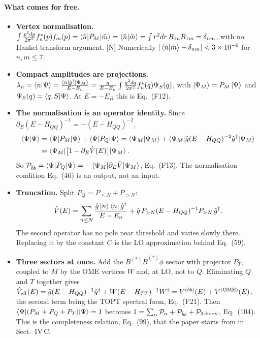 \documentclass[11pt,a4paper]{article}
\newcommand{\tagN}{\textcolor{red!70!black}{\textsf{\small[N]}}}
\renewcommand{\VQQ}{V^{(\bar bb)}}
\renewcommand{\VOME}{V^{\rm (OME)}}
\newcommand{\Pbb}{{\cal P}_{\bar bb}}
\begin{document}
\paragraph{What comes for free.}
\begin{itemize}
\item \textbf{Vertex normalisation.} $\int\frac{p^2dp}{2\pi^2}f_n^*(p)f_m(p)=\braket{\tilde n|P_M|\tilde m}=\braket{\tilde n|\tilde m}=\int r^2dr\,R_{1n}R_{1m}=\delta_{nm}$, with no Hankel-transform argument. \tagN{} Numerically $|\braket{\tilde n|\tilde m}-\delta_{nm}|<3\times10^{-6}$ for $n,m\le7$.
\item \textbf{Compact amplitudes are projections.} $\lambda_n=\braket{n|\Psi}=\frac{\braket{n|\hat g^\dagger|\Psi_M}}{E-E_n}=\frac{g}{E-E_n}\int\frac{q^2dq}{2\pi^2}f_n^*(q)\Psi_S(q)$, with $\ket{\Psi_M}=P_M\ket\Psi$ and $\Psi_S(q)=\braket{q,S|\Psi}$. At $E=-E_B$ this is Eq.~(F12).
\item \textbf{The normalisation is an operator identity.} Since $\partial_E(E-H_{QQ})^{-1}=-(E-H_{QQ})^{-2}$,
\begin{align}
\braket{\Psi|\Psi}&=\braket{\Psi|P_M|\Psi}+\braket{\Psi|P_Q|\Psi}
=\braket{\Psi_M|\Psi_M}+\braket{\Psi_M|\hat g(E-H_{QQ})^{-2}\hat g^\dagger|\Psi_M}\nonumber\\
&=\braket{\Psi_M|\big[1-\partial_E\hat V(E)\big]|\Psi_M}.
\end{align}
So $\Pbb=\braket{\Psi|P_Q|\Psi}=-\braket{\Psi_M|\partial_E\hat V|\Psi_M}$, Eq.~(F13). The normalisation condition Eq.~(46) is an output, not an input.
\item \textbf{Truncation.} Split $P_Q=P_{\le N}+P_{>N}$:
\begin{equation}
\hat V(E)=\sum_{n\le N}\frac{\hat g\ket n\bra n\hat g^\dagger}{E-E_n}+\hat g\,P_{>N}(E-H_{QQ})^{-1}P_{>N}\,\hat g^\dagger .
\end{equation}
The second operator has no pole near threshold and varies slowly there. Replacing it by the constant $C$ is the LO approximation behind Eq.~(59).
\item \textbf{Three sectors at once.} Add the $B^{(*)}\bar B^{(*)}\phi$ sector with projector $P_T$, coupled to $M$ by the OME vertices $W$ and, at LO, not to $Q$. Eliminating $Q$ and $T$ together gives $\hat V_{\rm eff}(E)=\hat g(E-H_{QQ})^{-1}\hat g^\dagger+W(E-H_{TT})^{-1}W^\dagger=\VQQ(E)+\VOME(E)$, the second term being the TOPT spectral form, Eq.~(F21). Then $\braket{\Psi|(P_M+P_Q+P_T)|\Psi}=1$ becomes $1=\sum_\alpha{\cal P}_\alpha+\Pbb+{\cal P}_{3\text{-body}}$, Eq.~(104). This is the completeness relation, Eq.~(99), that the paper starts from in Sect.~IV\,C.
\end{itemize}
\end{document}
